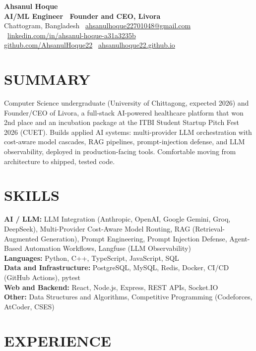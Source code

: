 \documentclass[10.5pt,a4paper]{article}
\begin{document}
{\huge \bfseries Ahsanul Hoque}\\[2pt]
{\bfseries AI/ML Engineer \textbar\ Founder and CEO, Livora}\\[5pt]
{\small
  Chattogram, Bangladesh \textbar\
  \href{mailto:ahsanulhoque22701048@gmail.com}{ahsanulhoque22701048@gmail.com} \textbar\
  \href{https://linkedin.com/in/ahsanul-hoque-a31a3235b}{linkedin.com/in/ahsanul-hoque-a31a3235b} \textbar\\
  \href{https://github.com/AhsanulHoque22}{github.com/AhsanulHoque22} \textbar\
  \href{https://ahsanulhoque22.github.io}{ahsanulhoque22.github.io}
}

\section*{SUMMARY}
Computer Science undergraduate (University of Chittagong, expected 2026) and Founder/CEO of Livora, a full-stack AI-powered healthcare platform that won 2nd place and an incubation package at the ITBI Student Startup Pitch Fest 2026 (CUET). Builds applied AI systems: multi-provider LLM orchestration with cost-aware model cascades, RAG pipelines, prompt-injection defense, and LLM observability, deployed in production-facing tools. Comfortable moving from architecture to shipped, tested code.

\section*{SKILLS}
\textbf{AI / LLM:} LLM Integration (Anthropic, OpenAI, Google Gemini, Groq, DeepSeek), Multi-Provider Cost-Aware Model Routing, RAG (Retrieval-Augmented Generation), Prompt Engineering, Prompt Injection Defense, Agent-Based Automation Workflows, Langfuse (LLM Observability)\\[2pt]
\textbf{Languages:} Python, C++, TypeScript, JavaScript, SQL\\[2pt]
\textbf{Data and Infrastructure:} PostgreSQL, MySQL, Redis, Docker, CI/CD (GitHub Actions), pytest\\[2pt]
\textbf{Web and Backend:} React, Node.js, Express, REST APIs, Socket.IO\\[2pt]
\textbf{Other:} Data Structures and Algorithms, Competitive Programming (Codeforces, AtCoder, CSES)

\section*{EXPERIENCE}
\end{document}
